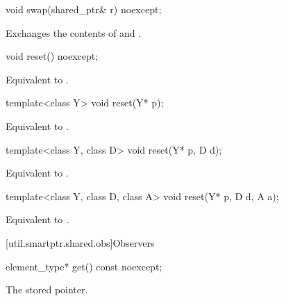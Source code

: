 %
\begin{itemdecl}
void swap(shared_ptr& r) noexcept;
\end{itemdecl}

\begin{itemdescr}

\pnum\effects  Exchanges the contents of  and .
\end{itemdescr}

%
\begin{itemdecl}
void reset() noexcept;
\end{itemdecl}

\begin{itemdescr}
\pnum\effects  Equivalent to .
\end{itemdescr}

%
\begin{itemdecl}
template<class Y> void reset(Y* p);
\end{itemdecl}

\begin{itemdescr}
\pnum\effects  Equivalent to .
\end{itemdescr}

%
\begin{itemdecl}
template<class Y, class D> void reset(Y* p, D d);
\end{itemdecl}

\begin{itemdescr}
\pnum\effects  Equivalent to .
\end{itemdescr}

%
\begin{itemdecl}
template<class Y, class D, class A> void reset(Y* p, D d, A a);
\end{itemdecl}

\begin{itemdescr}
\pnum
\effects  Equivalent to .
\end{itemdescr}

[util.smartptr.shared.obs]{Observers}
%
\begin{itemdecl}
element_type* get() const noexcept;
\end{itemdecl}

\begin{itemdescr}
\pnum\returns The stored pointer.
\end{itemdescr}

